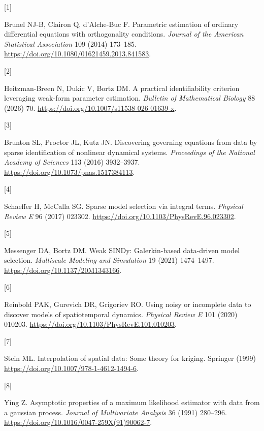 \documentclass[
  american,
  11pt,
]{article}
\newlength{\cslhangindent}
\newlength{\csllabelwidth}
\newenvironment{CSLReferences}[2] %
 {\begin{list}{}{%
  \setlength{\itemindent}{0pt}
  \setlength{\leftmargin}{0pt}
  \setlength{\parsep}{0pt}
  \ifodd #1
   \setlength{\leftmargin}{\cslhangindent}
   \setlength{\itemindent}{-1\cslhangindent}
  \fi
  \setlength{\itemsep}{#2\baselineskip}}}
 {\end{list}}
\newcommand{\CSLLeftMargin}[1]{\parbox[t]{\csllabelwidth}{\strut#1\strut}}
\newcommand{\CSLRightInline}[1]{\parbox[t]{\linewidth - \csllabelwidth}{\strut#1\strut}}
\begin{document}
\protect{}\label{refs}
\begin{CSLReferences}{0}{0}
\CSLLeftMargin{{[}1{]} }%
\CSLRightInline{{Brunel NJ-B, Clairon Q, d'Alche-Buc F}. Parametric
estimation of ordinary differential equations with orthogonality
conditions. \emph{Journal of the American Statistical Association} 109
(2014) 173--185. \url{https://doi.org/10.1080/01621459.2013.841583}.}

\CSLLeftMargin{{[}2{]} }%
\CSLRightInline{Heitzman-Breen N, Dukic V, Bortz DM. A practical
identifiability criterion leveraging weak-form parameter estimation.
\emph{Bulletin of Mathematical Biology} 88 (2026) 70.
\url{https://doi.org/10.1007/s11538-026-01639-x}.}

\CSLLeftMargin{{[}3{]} }%
\CSLRightInline{Brunton SL, Proctor JL, Kutz JN. Discovering governing
equations from data by sparse identification of nonlinear dynamical
systems. \emph{Proceedings of the National Academy of Sciences} 113
(2016) 3932--3937. \url{https://doi.org/10.1073/pnas.1517384113}.}

\CSLLeftMargin{{[}4{]} }%
\CSLRightInline{Schaeffer H, McCalla SG. Sparse model selection via
integral terms. \emph{Physical Review E} 96 (2017) 023302.
\url{https://doi.org/10.1103/PhysRevE.96.023302}.}

\CSLLeftMargin{{[}5{]} }%
\CSLRightInline{Messenger DA, Bortz DM. Weak {SINDy}: Galerkin-based
data-driven model selection. \emph{Multiscale Modeling and Simulation}
19 (2021) 1474--1497. \url{https://doi.org/10.1137/20M1343166}.}

\CSLLeftMargin{{[}6{]} }%
\CSLRightInline{Reinbold PAK, Gurevich DR, Grigoriev RO. Using noisy or
incomplete data to discover models of spatiotemporal dynamics.
\emph{Physical Review E} 101 (2020) 010203.
\url{https://doi.org/10.1103/PhysRevE.101.010203}.}

\CSLLeftMargin{{[}7{]} }%
\CSLRightInline{Stein ML. Interpolation of spatial data: Some theory for
kriging. Springer (1999)
\url{https://doi.org/10.1007/978-1-4612-1494-6}.}

\CSLLeftMargin{{[}8{]} }%
\CSLRightInline{Ying Z. Asymptotic properties of a maximum likelihood
estimator with data from a gaussian process. \emph{Journal of
Multivariate Analysis} 36 (1991) 280--296.
\url{https://doi.org/10.1016/0047-259X(91)90062-7}.}


\end{CSLReferences}
\end{document}
